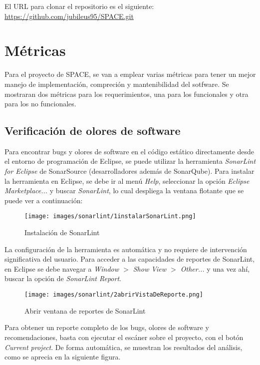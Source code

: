 \documentclass{scrreprt}
\begin{document}
El URL para clonar el repositorio es el siguiente: \href{https://github.com/jubileus95/SPACE.git}{https://github.com/jubileus95/SPACE.git}

\chapter{Métricas}

Para el proyecto de SPACE, se van a emplear varias métricas para tener un mejor manejo de implementación, compreción y mantenibilidad del sotfware. Se mostraran dos métricas para los requerimientos, una para los funcionales y otra para los no funcionales.

\section{Verificación de olores de software}

Para encontrar bugs y olores de software en el código estático directamente desde el entorno de programación de Eclipse, se puede utilizar la herramienta \textit{SonarLint for Eclipse} de SonarSource (desarrolladores además de SonarQube). Para instalar la herramienta en Eclipse, se debe ir al menú \textit{Help}, seleccionar la opción \textit{Eclipse Marketplace...} y buscar \textit{SonarLint}, lo cual despliega la ventana flotante que se puede ver a continuación:

\begin{figure}[H]
	\centering
    \texttt{[image: images/sonarlint/1instalarSonarLint.png]}
    \caption{Instalación de SonarLint}
\end{figure}

La configuración de la herramienta es automática y no requiere de intervención significativa del usuario. Para acceder a las capacidades de reportes de SonarLint, en Eclipse se debe navegar a \textit{Window $>$ Show View $>$ Other...} y una vez ahí, buscar la opción de \textit{SonarLint Report}.

\begin{figure}[H]
	\centering
    \texttt{[image: images/sonarlint/2abrirVistaDeReporte.png]}
    \caption{Abrir ventana de reportes de SonarLint}
\end{figure}

Para obtener un reporte completo de los bugs, olores de software y recomendaciones, basta con ejecutar el escáner sobre el proyecto, con el botón \textit{Current project}. De forma automática, se muestran los resultados del análisis, como se aprecia en la siguiente figura.
\end{document}
